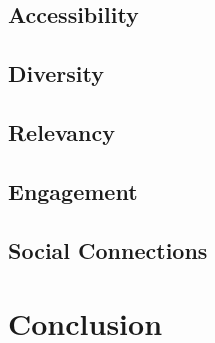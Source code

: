 \documentclass{sigchi}
\begin{document}
\subsection{Accessibility}
\subsection{Diversity}
\subsection{Relevancy}
\subsection{Engagement}
\subsection{Social Connections}

\section{Conclusion}




\end{document}
